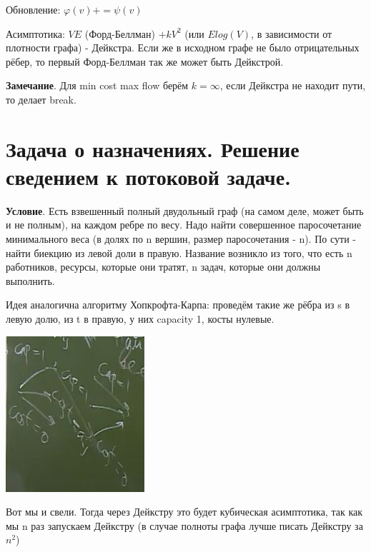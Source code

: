 Обновление: $\varphi(v) += \psi(v)$

Асимптотика: $VE$ (Форд-Беллман) $+ kV^2$ (или $Elog(V)$, в зависимости от плотности графа) - Дейкстра. Если же в исходном графе не было отрицательных рёбер, то первый Форд-Беллман так же может быть Дейкстрой.

\textbf{Замечание}. Для min cost max flow берём $k = \infty$, если Дейкстра не находит пути, то делает break.

\setcounter{section}{91}
\section{Задача о назначениях. Решение сведением к потоковой задаче.}

\textbf{Условие}. Есть взвешенный полный двудольный граф (на самом деле, может быть и не полным), на каждом ребре по весу. Надо найти совершенное паросочетание минимального веса (в долях по n вершин, размер паросочетания - n). По сути - найти биекцию из левой доли в правую. Название возникло из того, что есть n работников, ресурсы, которые они тратят, n задач, которые они должны выполнить.

Идея аналогична алгоритму Хопкрофта-Карпа: проведём такие же рёбра из s в левую долю, из t в правую, у них capacity 1, косты нулевые. 

\includegraphics[]{images/87-92_tasks}

Вот мы и свели. Тогда через Дейкстру это будет кубическая асимптотика, так как мы n раз запускаем Дейкстру (в случае полноты графа лучше писать Дейкстру за $n^2$)
